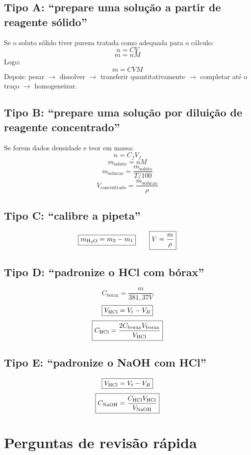 \documentclass[a4paper,12pt]{article}
\begin{document}
\subsection{Tipo A: ``prepare uma solução a partir de reagente sólido''}

Se o soluto sólido tiver pureza tratada como adequada para o cálculo:
\[
n=CV
\]
\[
m=nM
\]
Logo:
\[
\boxed{m=CVM}
\]
Depois: pesar $\rightarrow$ dissolver $\rightarrow$ transferir quantitativamente $\rightarrow$ completar até o traço $\rightarrow$ homogeneizar.

\subsection{Tipo B: ``prepare uma solução por diluição de reagente concentrado''}

Se forem dados densidade e teor em massa:
\[
\boxed{n=C_fV_f}
\]
\[
\boxed{m_{\mathrm{soluto}}=nM}
\]
\[
\boxed{m_{\mathrm{solucao}}=\frac{m_{\mathrm{soluto}}}{T/100}}
\]
\[
\boxed{V_{\mathrm{concentrado}}=\frac{m_{\mathrm{solucao}}}{\rho}}
\]

\subsection{Tipo C: ``calibre a pipeta''}

\[
\boxed{m_{\ce{H2O}}=m_2-m_1}
\qquad
\boxed{V=\frac{m}{\rho}}
\]

\subsection{Tipo D: ``padronize o HCl com bórax''}

\[
\boxed{C_{\mathrm{borax}}=\frac{m}{381{,}37V}}
\]
\[
\boxed{V_{\ce{HCl}}=V_t-V_B}
\]
\[
\boxed{C_{\ce{HCl}}=\frac{2C_{\mathrm{borax}}V_{\mathrm{borax}}}{V_{\ce{HCl}}}}
\]

\subsection{Tipo E: ``padronize o NaOH com HCl''}

\[
\boxed{V_{\ce{HCl}}=V_t-V_B}
\]
\[
\boxed{C_{\ce{NaOH}}=\frac{C_{\ce{HCl}}V_{\ce{HCl}}}{V_{\ce{NaOH}}}}
\]

\section{Perguntas de revisão rápida}
\end{document}
